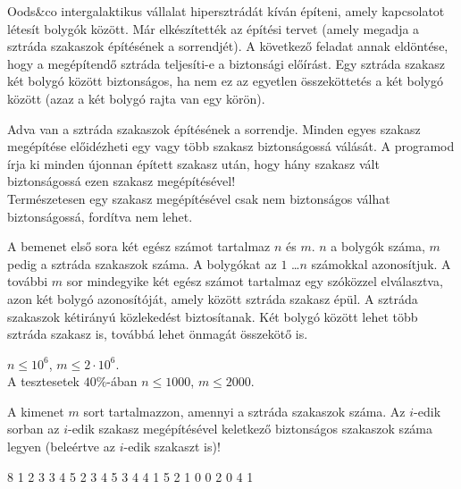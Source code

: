 





Oods\&co intergalaktikus vállalat  hipersztrádát kíván építeni,
amely kapcsolatot létesít bolygók között. Már elkészítették az építési tervet (amely megadja a sztráda szakaszok építésének a sorrendjét). A következő feladat annak eldöntése, hogy a megépítendő sztráda teljesíti-e a biztonsági előírást. Egy sztráda szakasz két bolygó között biztonságos, ha nem ez az egyetlen összeköttetés a két bolygó között (azaz a két bolygó rajta van egy körön).


Adva van a sztráda szakaszok építésének a sorrendje. Minden egyes szakasz megépítése előidézheti egy vagy több szakasz biztonságossá válását. A programod írja ki minden újonnan épített szakasz után, hogy hány szakasz vált biztonságossá ezen szakasz megépítésével!\\
Természetesen egy szakasz megépítésével csak nem biztonságos válhat biztonságossá, fordítva nem lehet.


A bemenet első sora két egész számot tartalmaz $n$ és $m$.
$n$ a bolygók száma, $m$ pedig a sztráda szakaszok száma.
A bolygókat az $1$ \dots $n$ számokkal azonosítjuk.
A további $m$ sor mindegyike két egész számot tartalmaz egy szóközzel elválasztva, azon két bolygó azonosítóját, amely között sztráda szakasz épül. A sztráda szakaszok kétirányú közlekedést biztosítanak. Két bolygó között lehet több sztráda szakasz is, továbbá lehet önmagát összekötő is.

\smallskip

 $n \leq 10^6$, $m \leq 2\cdot10^6$.\\
A tesztesetek $40\%$-ában $n \leq 1000$, $m \leq 2000$.

A kimenet $m$ sort tartalmazzon, amennyi a sztráda szakaszok száma. Az $i$-edik sorban az $i$-edik szakasz megépítésével keletkező biztonságos szakaszok száma legyen (beleértve az $i$-edik szakaszt is)!



 8
1 2
3 3
4 5
2 3
4 5
3 4
4 1
5 2
1
0
0
2
0
4
1
\sampleEND


 